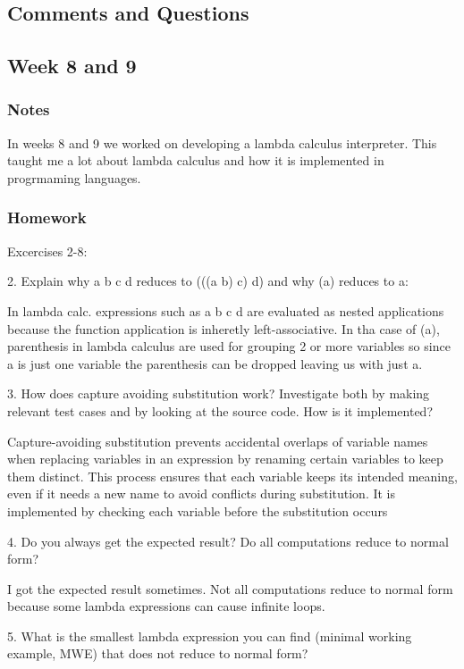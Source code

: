 \documentclass{article}
\theoremstyle{theorem}
\theoremstyle{definition}
\theoremstyle{remark}
\begin{document}
\subsection*{Comments and Questions}


\subsection{Week 8 and 9}

\subsubsection*{Notes}
In weeks 8 and 9 we worked on developing a lambda calculus interpreter. This taught me a lot about lambda calculus and how it is implemented in progrmaming languages.

\subsubsection*{Homework}
Excercises 2-8:

2. Explain why a b c d reduces to (((a b) c) d) and why (a) reduces to a:

In lambda calc. expressions such as a b c d are evaluated as nested applications because the function application is inheretly left-associative. In tha case of (a), parenthesis in lambda calculus are used for grouping 2 or more variables so since a is just one variable the parenthesis can be dropped leaving us with just a.

3. How does capture avoiding substitution work? Investigate both by making relevant test cases and by looking at the source code. How is it implemented?

Capture-avoiding substitution prevents accidental overlaps of variable names when replacing variables in an expression by renaming certain variables to keep them distinct. This process ensures that each variable keeps its intended meaning, even if it needs a new name to avoid conflicts during substitution. It is implemented by checking each variable before the substitution occurs

4. Do you always get the expected result? Do all computations reduce to normal form?

I got the expected result sometimes. Not all computations reduce to normal form because some lambda expressions can cause infinite loops.

5. What is the smallest lambda expression you can find (minimal working example, MWE) that does not reduce to normal form?
\end{document}
